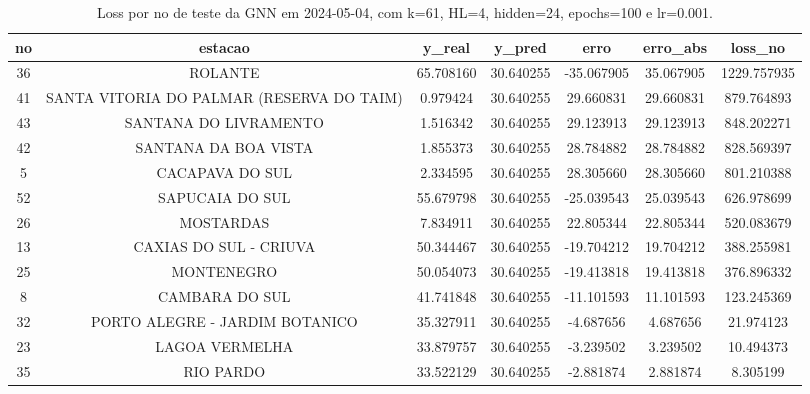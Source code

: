 \begin{table}[h]
\centering
\caption{Loss por no de teste da GNN em 2024-05-04, com k=61, HL=4, hidden=24, epochs=100 e lr=0.001.}
\label{tab:gnn_loss_k61_hl4_h24_e100_d20240504}
\begin{tabular}{ccccccc}
\toprule
no & estacao & y\_real & y\_pred & erro & erro\_abs & loss\_no \\
\midrule
36 & ROLANTE & 65.708160 & 30.640255 & -35.067905 & 35.067905 & 1229.757935 \\
41 & SANTA VITORIA DO PALMAR (RESERVA DO TAIM) & 0.979424 & 30.640255 & 29.660831 & 29.660831 & 879.764893 \\
43 & SANTANA DO LIVRAMENTO & 1.516342 & 30.640255 & 29.123913 & 29.123913 & 848.202271 \\
42 & SANTANA DA BOA VISTA & 1.855373 & 30.640255 & 28.784882 & 28.784882 & 828.569397 \\
5 & CACAPAVA DO SUL & 2.334595 & 30.640255 & 28.305660 & 28.305660 & 801.210388 \\
52 & SAPUCAIA DO SUL & 55.679798 & 30.640255 & -25.039543 & 25.039543 & 626.978699 \\
26 & MOSTARDAS & 7.834911 & 30.640255 & 22.805344 & 22.805344 & 520.083679 \\
13 & CAXIAS DO SUL - CRIUVA & 50.344467 & 30.640255 & -19.704212 & 19.704212 & 388.255981 \\
25 & MONTENEGRO & 50.054073 & 30.640255 & -19.413818 & 19.413818 & 376.896332 \\
8 & CAMBARA DO SUL & 41.741848 & 30.640255 & -11.101593 & 11.101593 & 123.245369 \\
32 & PORTO ALEGRE - JARDIM BOTANICO & 35.327911 & 30.640255 & -4.687656 & 4.687656 & 21.974123 \\
23 & LAGOA VERMELHA & 33.879757 & 30.640255 & -3.239502 & 3.239502 & 10.494373 \\
35 & RIO PARDO & 33.522129 & 30.640255 & -2.881874 & 2.881874 & 8.305199 \\
\bottomrule
\end{tabular}
\end{table}
